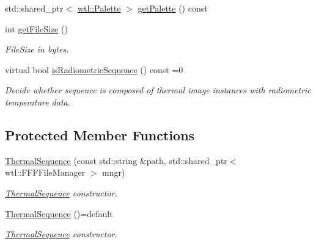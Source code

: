 \begin{DoxyCompactItemize}
std\+::shared\+\_\+ptr$<$ \hyperlink{classwtl_1_1_palette}{wtl\+::\+Palette} $>$ \hyperlink{classwtl_1_1_thermal_sequence_a1a08643d428876f32e3155a9cd0c9f2e}{get\+Palette} () const
\item 
int \hyperlink{classwtl_1_1_thermal_sequence_a392e7c6e2b832d05c9cdb931c7cddb4f}{get\+File\+Size} ()
\begin{DoxyCompactList}\small\item\em File\+Size in bytes. \end{DoxyCompactList}\item 
virtual bool \hyperlink{classwtl_1_1_thermal_sequence_a572ec84280f0edc98c5ad0c0a0593335}{is\+Radiometric\+Sequence} () const =0
\begin{DoxyCompactList}\small\item\em Decide whether sequence is composed of thermal image instances with radiometric temperature data. \end{DoxyCompactList}\end{DoxyCompactItemize}
\subsection*{Protected Member Functions}
\begin{DoxyCompactItemize}
\item 
\hyperlink{classwtl_1_1_thermal_sequence_a222d1dcbb659a83cff8f60a431f8a370}{Thermal\+Sequence} (const std\+::string \&path, std\+::shared\+\_\+ptr$<$ wtl\+::\+F\+F\+F\+File\+Manager $>$ mngr)
\begin{DoxyCompactList}\small\item\em \hyperlink{classwtl_1_1_thermal_sequence}{Thermal\+Sequence} constructor. \end{DoxyCompactList}\item 
\hyperlink{classwtl_1_1_thermal_sequence_ae42f26a732f24d5b93182e320b360282}{Thermal\+Sequence} ()=default
\begin{DoxyCompactList}\small\item\em \hyperlink{classwtl_1_1_thermal_sequence}{Thermal\+Sequence} constructor. \end{DoxyCompactList}\end{DoxyCompactItemize}
